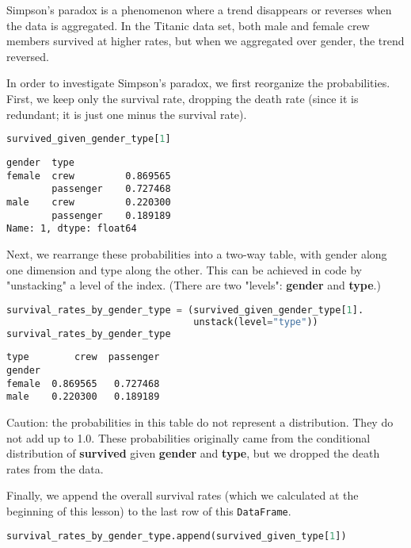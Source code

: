 Simpson's paradox is a phenomenon where a trend disappears or reverses when the data is aggregated. In the Titanic data set, both male and female crew members survived at higher rates, but when we aggregated over gender, the trend reversed.

In order to investigate Simpson's paradox, we first reorganize the probabilities. First, we keep only the survival rate, dropping the death rate (since it is redundant; it is just one minus the survival rate).

\begin{lstlisting}[language=Python]
survived_given_gender_type[1]
\end{lstlisting}

\small\begin{verbatim}
gender  type     
female  crew         0.869565
        passenger    0.727468
male    crew         0.220300
        passenger    0.189189
Name: 1, dtype: float64
\end{verbatim}



Next, we rearrange these probabilities into a two-way table, with gender along one dimension and type along the other. This can be achieved in code by "unstacking" a level of the index. (There are two "levels": \textbf{gender} and \textbf{type}.)

\begin{lstlisting}[language=Python]
survival_rates_by_gender_type = (survived_given_gender_type[1].
                                 unstack(level="type"))
survival_rates_by_gender_type
\end{lstlisting}

\small\begin{verbatim}
type        crew  passenger
gender                     
female  0.869565   0.727468
male    0.220300   0.189189
\end{verbatim}



Caution: the probabilities in this table do not represent a distribution. They do not add up to 1.0. These probabilities originally came from the conditional distribution of \textbf{survived} given \textbf{gender} and \textbf{type}, but we dropped the death rates from the data.

Finally, we append the overall survival rates (which we calculated at the beginning of this lesson) to the last row of this \verb|DataFrame|.

\begin{lstlisting}[language=Python]
survival_rates_by_gender_type.append(survived_given_type[1])
\end{lstlisting}

